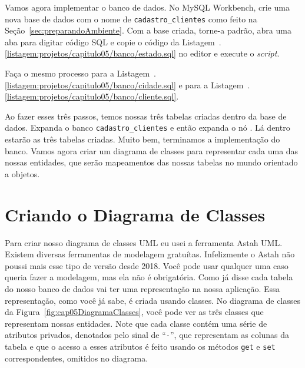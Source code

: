 Vamos agora implementar o banco de dados. No MySQL Workbench, crie uma nova base de dados com o nome de \texttt{cadastro\_clientes} como feito na Seção~\ref{sec:preparandoAmbiente}. Com a base criada, torne-a padrão, abra uma aba para digitar código SQL e copie o código da Listagem~\thechapter.\ref{listagem:projetos/capitulo05/banco/estado.sql} no editor e execute o \textit{script}.


Faça o mesmo processo para a Listagem~\thechapter.\ref{listagem:projetos/capitulo05/banco/cidade.sql} e para a Listagem~\thechapter.\ref{listagem:projetos/capitulo05/banco/cliente.sql}.



Ao fazer esses três passos, temos nossas três tabelas criadas dentro da base de dados. Expanda o banco \texttt{cadastro\_clientes} e então expanda o nó . Lá dentro estarão as três tabelas criadas. Muito bem, terminamos a implementação do banco. Vamos agora criar um diagrama de classes para representar cada uma das nossas entidades, que serão mapeamentos das nossas tabelas no mundo orientado a objetos.


\section{Criando o Diagrama de Classes}

Para criar nosso diagrama de classes UML eu usei a ferramenta Astah UML. Existem diversas ferramentas de modelagem gratuítas. Infelizmente o Astah não poussi mais esse tipo de versão desde 2018. Você pode usar qualquer uma caso queria fazer a modelagem, mas ela não é obrigatória. Como já disse cada tabela do nosso banco de dados vai ter uma representação na nossa aplicação. Essa representação, como você já sabe, é criada usando classes. No diagrama de classes da Figura~\ref{fig:cap05DiagramaClasses}, você pode ver as três classes que representam nossas entidades. Note que cada classe contém uma série de atributos privados, denotados pelo sinal de ``\texttt{-}'', que representam as colunas da tabela e que o acesso a esses atributos é feito usando os métodos \texttt{get} e \texttt{set} correspondentes, omitidos no diagrama.

